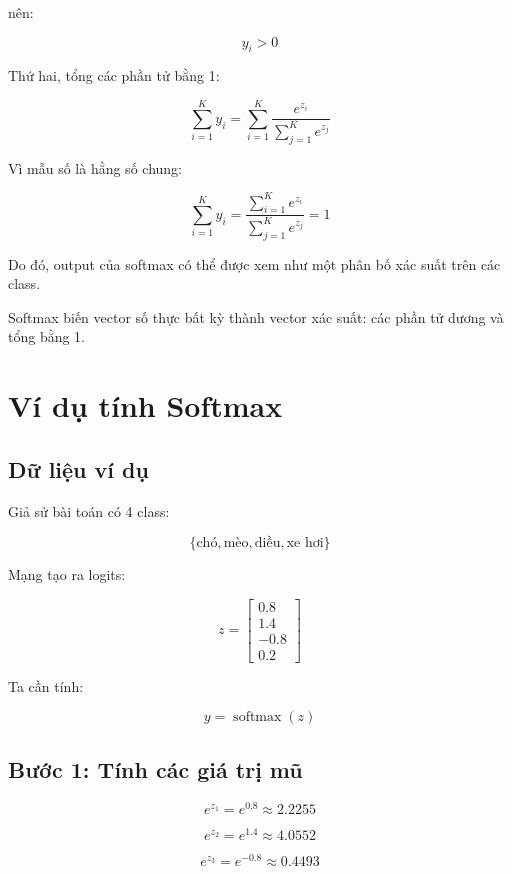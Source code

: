 \documentclass[12pt,a4paper]{report}
\begin{document}
nên:

\[
    y_i > 0
\]

Thứ hai, tổng các phần tử bằng 1:

\[
    \sum_{i=1}^{K} y_i
    =
    \sum_{i=1}^{K}
    \frac{e^{z_i}}
    {\sum_{j=1}^{K} e^{z_j}}
\]

Vì mẫu số là hằng số chung:

\[
    \sum_{i=1}^{K} y_i
    =
    \frac{
    \sum_{i=1}^{K} e^{z_i}
    }
    {
    \sum_{j=1}^{K} e^{z_j}
    }
    =
    1
\]

Do đó, output của softmax có thể được xem như một phân bố xác suất trên các class.

\begin{ghinho}
Softmax biến vector số thực bất kỳ thành vector xác suất: các phần tử dương và tổng bằng 1.
\end{ghinho}

\chapter{Ví dụ tính Softmax}

\section{Dữ liệu ví dụ}

Giả sử bài toán có 4 class:

\[
    \{\text{chó}, \text{mèo}, \text{diều}, \text{xe hơi}\}
\]

Mạng tạo ra logits:

\[
    z =
    \begin{bmatrix}
    0.8\\
    1.4\\
    -0.8\\
    0.2
    \end{bmatrix}
\]

Ta cần tính:

\[
    y = \operatorname{softmax}(z)
\]

\section{Bước 1: Tính các giá trị mũ}

\[
    e^{z_1}=e^{0.8}\approx 2.2255
\]

\[
    e^{z_2}=e^{1.4}\approx 4.0552
\]

\[
    e^{z_3}=e^{-0.8}\approx 0.4493
\]
\end{document}
